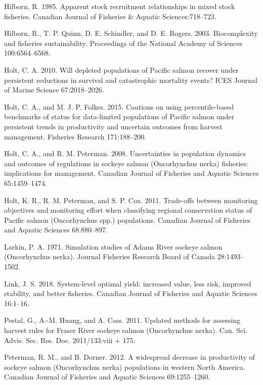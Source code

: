 \documentclass[11pt]{book}
\begin{document}
\hypertarget{ref-Hilborn1985}{}
Hilborn, R. 1985. Apparent stock recruitment relationships in mixed stock fisheries. Canadian Journal of Fisheries \& Aquatic Sciences:718--723.

\hypertarget{ref-Hilborn2003}{}
Hilborn, R., T. P. Quinn, D. E. Schindler, and D. E. Rogers. 2003. Biocomplexity and fisheries sustainability. Proceedings of the National Academy of Sciences 100:6564--6568.

\hypertarget{ref-Holt2010}{}
Holt, C. A. 2010. Will depleted populations of Pacific salmon recover under persistent reductions in survival and catastrophic mortality events? ICES Journal of Marine Science 67:2018--2026.

\hypertarget{ref-Holt2015}{}
Holt, C. A., and M. J. P. Folkes. 2015. Cautions on using percentile-based benchmarks of status for data-limited populations of Pacific salmon under persistent trends in productivity and uncertain outcomes from harvest management. Fisheries Research 171:188--200.

\hypertarget{ref-Holt2008}{}
Holt, C. A., and R. M. Peterman. 2008. Uncertainties in population dynamics and outcomes of regulations in sockeye salmon (Oncorhynchus nerka) fisheries: implications for management. Canadian Journal of Fisheries and Aquatic Sciences 65:1459--1474.

\hypertarget{ref-KHolt2011}{}
Holt, K. R., R. M. Peterman, and S. P. Cox. 2011. Trade-offs between monitoring objectives and monitoring effort when classifying regional conservation status of Pacific salmon (Oncorhynchus spp.) populations. Canadian Journal of Fisheries and Aquatic Sciences 68:880--897.

\hypertarget{ref-Larkin1971}{}
Larkin, P. A. 1971. Simulation studies of Adams River sockeye salmon (Oncorhynchus nerka). Journal Fisheries Research Board of Canada 28:1493--1502.

\hypertarget{ref-Link2018}{}
Link, J. S. 2018. System-level optimal yield: increased value, less risk, improved stability, and better fisheries. Canadian Journal of Fisheries and Aquatic Sciences 16:1--16.

\hypertarget{ref-Pestal2011}{}
Pestal, G., A.-M. Huang, and A. Cass. 2011. Updated methods for assessing harvest rules for Fraser River sockeye salmon (Oncorhynchus nerka). Can. Sci. Advis. Sec. Res. Doc. 2011/133:viii + 175.

\hypertarget{ref-Peterman2012}{}
Peterman, R. M., and B. Dorner. 2012. A widespread decrease in productivity of sockeye salmon (Oncorhynchus nerka) populations in western North America. Canadian Journal of Fisheries and Aquatic Sciences 69:1255--1260.
\end{document}
